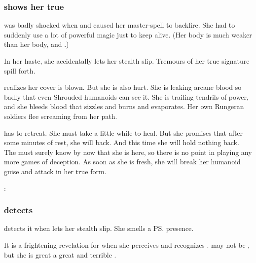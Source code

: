 \subsubsection{\Nzessuacrith shows her true \colours}
\Takestsha was badly shocked when  and caused her \quo{\EreshKali} master-spell to backfire. 
She had to suddenly use a lot of powerful magic just to keep alive. 
(Her \human body is much weaker than her \draconian body, and .) 

In her haste, she accidentally lets her stealth slip.
Tremours of her true \vertex signature spill forth. 

\Takestsha realizes her cover is blown. 
But she is also hurt. 
She is leaking arcane blood so badly that even Shrouded humanoids can see it.
She is trailing tendrils of power, and she bleeds blood that sizzles and burns and evaporates. 
Her own Rungeran soldiers flee screaming from her path.

\Takestsha has to retreat. 
She must take a little while to heal. 
But she promises that after some minutes of rest, she will back.
And this time she will hold nothing back.
The \resphain must surely know by now that she is here, so there is no point in playing any more games of deception.
As soon as she is fresh, she will break her humanoid guise and attack in her true form. 

\begin{prose}
  \Takestsha: 
\end{prose}






\subsubsection{\Achsah detects \Nzessuacrith}
\Achsah detects it when \Nzessuacrith lets her stealth slip. 
She smells a \ps{\dragon}{} presence. 

It is a frightening  revelation for \Achsah when she perceives and recognizes \Nzessuacrith.
\Nzessuacrith may not be \Iscrafel, but she is great a great and terrible \dragon. 

